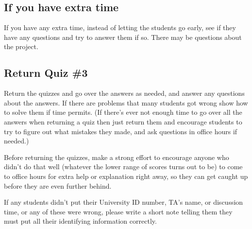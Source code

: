 \documentclass[12pt]{article}
\begin{document}
    \subsection{If you have extra time}

      If you have any extra time, instead of letting the students go early,
    see if they have any questions and try to answer them if so.  There may
    be questions about the project.

    \subsection{Return Quiz \#3}

      Return the quizzes and go over the answers as needed, and answer any
    questions about the answers.  If there are problems that many students
    got wrong show how to solve them if time permits.  (If there's ever not
    enough time to go over all the answers when returning a quiz then just
    return them and encourage students to try to figure out what mistakes
    they made, and ask questions in office hours if needed.)


      Before returning the quizzes, make a strong effort to encourage anyone
    who didn't do that well (whatever the lower range of scores turns out to
    be) to come to office hours for extra help or explanation right away, so
    they can get caught up before they are even further behind.

      If any students didn't put their University ID number, TA's name, or
    discussion time, or any of these were wrong, please write a short note
    telling them they must put all their identifying information correctly.
\end{document}
